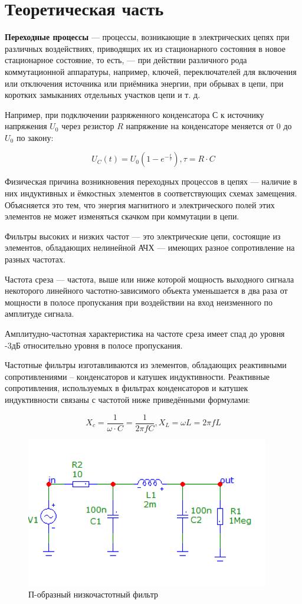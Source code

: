 \section{Теоретическая часть}

\textbf{Переходные процессы} — процессы, возникающие в электрических цепях при различных воздействиях, приводящих их из стационарного состояния в новое стационарное состояние, то есть, — при действии различного рода коммутационной аппаратуры, например, ключей, переключателей для включения или отключения источника или приёмника энергии, при обрывах в цепи, при коротких замыканиях отдельных участков цепи и т. д.

Например, при подключении разряженного конденсатора $С$ к источнику напряжения $U_0$ через резистор $R$ напряжение на конденсаторе меняется от 0 до $U_0$ по закону:

\[
U_C (t) = U_0(1-e^{-\frac{t}{\tau}}), \tau = R \cdot C
\]

Физическая причина возникновения переходных процессов в цепях — наличие в них индуктивных и ёмкостных элементов в соответствующих схемах замещения. Объясняется это тем, что энергия магнитного и электрического полей этих элементов не может изменяться скачком при коммутации в цепи. 

Фильтры высоких и низких частот — это электрические цепи, состоящие из элементов, обладающих нелинейной АЧХ — имеющих разное сопротивление на разных частотах.

Частота среза — частота, выше или ниже которой мощность выходного сигнала некоторого линейного частотно-зависимого объекта уменьшается в два раза от мощности в полосе пропускания при воздействии на вход неизменного по амплитуде сигнала. 

Амплитудно-частотная характеристика на частоте среза имеет спад до уровня -3дБ относительно уровня в полосе пропускания. 

Частотные фильтры изготавливаются из элементов, обладающих реактивными сопротивлениями – конденсаторов и катушек индуктивности. Реактивные сопротивления, используемых в фильтрах конденсаторов и катушек индуктивности связаны с частотой ниже приведёнными формулами:

\[
X_c = \frac{1}{\omega \cdot C} = \frac{1}{2 \pi f C}, X_L = \omega L = 2 \pi f L
\]

\begin{figure}[H]
	\centering
	\includegraphics[width=0.7\linewidth]{img/f1}
	\caption{П-образный низкочастотный фильтр}
\end{figure}

